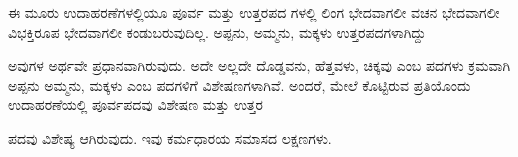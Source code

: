 \indent ಈ ಮೂರು ಉದಾಹರಣೆಗಳಲ್ಲಿಯೂ ಪೂರ್ವ ಮತ್ತು ಉತ್ತರಪದ ಗಳಲ್ಲಿ ಲಿಂಗ ಭೇದವಾಗಲೀ ವಚನ ಭೇದವಾಗಲೀ ವಿಭಕ್ತಿರೂಪ ಭೇದವಾಗಲೀ ಕಂಡುಬರುವುದಿಲ್ಲ. ಅಪ್ಪನು, ಅಮ್ಮನು, ಮಕ್ಕಳು ಉತ್ತರಪದಗಳಾಗಿದ್ದು\par

\indent ಅವುಗಳ ಅರ್ಥವೇ ಪ್ರಧಾನವಾಗಿರುವುದು. ಅದೇ ಅಲ್ಲದೇ ದೊಡ್ಡವನು, ಹೆತ್ತವಳು, ಚಿಕ್ಕವು ಎಂಬ ಪದಗಳು ಕ್ರಮವಾಗಿ ಅಪ್ಪನು ಅಮ್ಮನು, ಮಕ್ಕಳು ಎಂಬ ಪದಗಳಿಗೆ ವಿಶೇಷಣಗಳಾಗಿವೆ. ಅಂದರೆ, ಮೇಲೆ ಕೊಟ್ಟಿರುವ ಪ್ರತಿಯೊಂದು ಉದಾಹರಣೆಯಲ್ಲಿ ಪೂರ್ವಪದವು ವಿಶೇಷಣ ಮತ್ತು ಉತ್ತರ\par

\indent ಪದವು ವಿಶೇಷ್ಯ ಆಗಿರುವುದು. ಇವು ಕರ್ಮಧಾರಯ ಸಮಾಸದ ಲಕ್ಷಣಗಳು.\par
